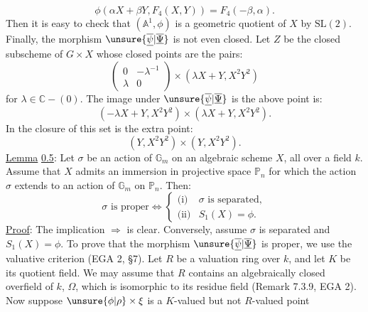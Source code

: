 \[
\phi(\alpha X+\beta Y,F_4(X,Y))=F_4(-\beta,\alpha).
\]
Then it is easy to check that $(\mathbb A^1,\phi)$ is a geometric quotient of $X$ by $\mathrm{SL}(2)$. Finally, the morphism $\unsure{\overline{\underline{\psi}}|\overline{\underline{\Psi}}}$ is not even closed. Let $Z$ be the closed subscheme of $G\times X$ whose closed points are the pairs:
\[
\begin{pmatrix}0&-\lambda^{-1}\\\lambda&0\end{pmatrix}\times(\lambda X+Y,X^2Y^2)
\]
for $\lambda\in\mathbb C-(0)$. The image under $\unsure{\overline{\underline{\psi}}|\overline{\underline{\Psi}}}$ is the above point is:
\[
(-\lambda X+Y,X^2Y^2)\times(\lambda X+Y,X^2Y^2).
\]
In the closure of this set is the extra point:
\[
(Y,X^2Y^2)\times(Y,X^2Y^2).
\]
\uline{Lemma} \uline{0.5}: Let $\sigma$ be an action of $\mathbb G_m$ on an algebraic scheme $X$, all over a field $k$. Assume that $X$ admits an immersion in projective space $\mathbb P_n$ for which the action $\sigma$ extends to an action of $\mathbb G_m$ on $\mathbb P_n$. Then:
\[
\sigma\text{ is proper}\Longleftrightarrow\begin{cases}\text{(i)}&\sigma\text{ is separated},\\\text{(ii)}&S_1(X)=\phi.\end{cases}
\]
\uline{Proof}: The implication $\Longrightarrow$ is clear. Conversely, assume $\sigma$ is separated and $S_1(X)=\phi$. To prove that the morphism $\unsure{\overline{\underline{\psi}}|\overline{\underline{\Psi}}}$ is proper, we use the valuative criterion (EGA 2, \S7). Let $R$ be a valuation ring over $k$, and let $K$ be its quotient field. We may assume that $R$ contains an algebraically closed overfield of $k$, $\Omega$, which is isomorphic to its residue field (Remark 7.3.9, EGA 2). Now suppose $\unsure{\phi|\rho}\times\xi$ is a $K$-valued but not $R$-valued point
